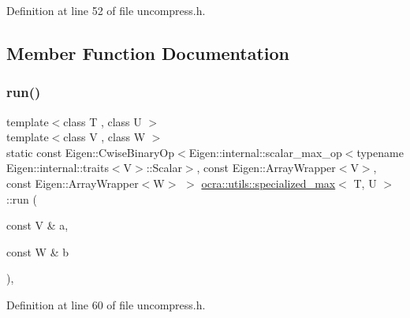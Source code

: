 Definition at line 52 of file uncompress.\+h.



\subsection{Member Function Documentation}
\hypertarget{structocra_1_1utils_1_1specialized__max_a597099a14b8243fa865f8f461ec655d9}{}\label{structocra_1_1utils_1_1specialized__max_a597099a14b8243fa865f8f461ec655d9} 
\subsubsection{\texorpdfstring{run()}{run()}\hspace{0.1cm}{\footnotesize\ttfamily [1/2]}}
{\footnotesize\ttfamily template$<$class T , class U $>$ \\
template$<$class V , class W $>$ \\
static const Eigen\+::\+Cwise\+Binary\+Op$<$Eigen\+::internal\+::scalar\+\_\+max\+\_\+op$<$typename Eigen\+::internal\+::traits$<$V$>$\+::Scalar$>$, const Eigen\+::\+Array\+Wrapper$<$V$>$, const Eigen\+::\+Array\+Wrapper$<$W$>$ $>$ \hyperlink{structocra_1_1utils_1_1specialized__max}{ocra\+::utils\+::specialized\+\_\+max}$<$ T, U $>$\+::run (\begin{DoxyParamCaption}\item[{const V \&}]{a,  }\item[{const W \&}]{b }\end{DoxyParamCaption})\hspace{0.3cm}{\ttfamily [inline]}, {\ttfamily [static]}}



Definition at line 60 of file uncompress.\+h.

\hypertarget{structocra_1_1utils_1_1specialized__max_acd525475852219cc691bfafd273ed5fb}{}\label{structocra_1_1utils_1_1specialized__max_acd525475852219cc691bfafd273ed5fb} 
